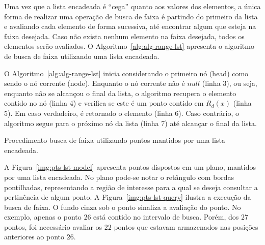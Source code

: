 Uma vez que a lista encadeada é ``cega'' quanto aos valores dos elementos,
a única forma de realizar uma operação de busca de faixa
é partindo do primeiro da lista e avaliando cada elemento
de forma sucessiva, até encontrar algum que esteja na faixa desejada.
Caso não exista nenhum elemento na faixa desejada, todos os elementos serão avaliados.
O Algoritmo~\ref{alg:alg-range-lst} apresenta o algoritmo de busca
de faixa utilizando uma lista encadeada.

O Algoritmo~\ref{alg:alg-range-lst} inicia considerando o primeiro nó (head) como sendo o nó corrente (node).
Enquanto o nó corrente não é $null$ (linha 3), ou seja, enquanto não
se alcançou o final da lista, o algoritmo
recupera o elemento contido no nó (linha 4) e verifica
se este é um ponto contido em $R_d(x)$ (linha 5).
Em caso verdadeiro, é retornado o elemento (linha 6).
Caso contrário, o algoritmo segue para o próximo nó da
lista (linha 7) até alcançar o final da lista.

\begin{algorithm}
  
  \caption{Procedimento busca de faixa utilizando pontos mantidos por uma lista encadeada.}
  \label{alg:alg-range-lst}
\end{algorithm}

A Figura~\ref{img:pts-lst-model} apresenta pontos dispostos em um plano,
mantidos por uma lista encadeada.
No plano pode-se notar o retângulo com bordas pontilhadas, representando a região
de interesse para a qual se deseja consultar a pertinência de algum ponto.
A Figura~\ref{img:pts-lst-query} ilustra a execução da busca de faixa.
O fundo cinza sob o ponto sinaliza a avaliação do ponto.
No exemplo, apenas o ponto $26$ está contido no intervalo de busca.
Porém, dos $27$ pontos, foi necessário avaliar os $22$ pontos que estavam
armazenados nas posições anteriores ao ponto $26$.


